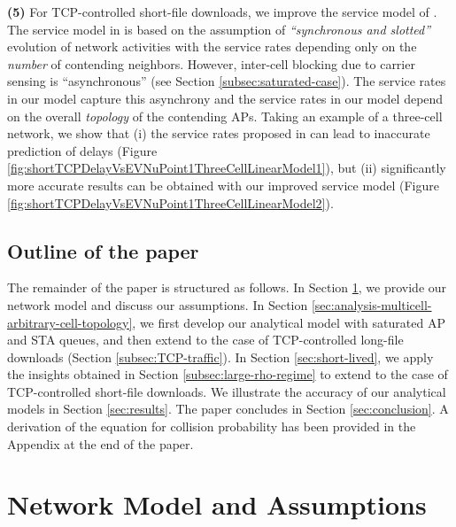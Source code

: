 \documentclass[10pt,a4paper,journal]{IEEEtran}
\theoremstyle{definition}
\theoremstyle{remark}
\theoremstyle{plain}
\begin{document}
\vspace{1mm}

\noindent \textbf{(5)} For TCP-controlled short-file downloads, we improve the service model of \cite{wanet.bonald08multicellprocsharing}. The service model in \cite{wanet.bonald08multicellprocsharing} is based on the assumption of \textit{``synchronous and slotted''} evolution of network activities with the service rates depending only on the \textit{number} of contending neighbors. However, inter-cell blocking due to carrier sensing is ``asynchronous'' (see Section \ref{subsec:saturated-case}). The service rates in our model capture this asynchrony and the service rates in our model depend on the overall \textit{topology} of the contending APs. Taking an example of a three-cell network, we show that (i) the service rates proposed in \cite{wanet.bonald08multicellprocsharing} can lead to inaccurate prediction of delays (Figure \ref{fig:shortTCPDelayVsEVNuPoint1ThreeCellLinearModel1}), but (ii) significantly more accurate results can be obtained with our improved service model (Figure \ref{fig:shortTCPDelayVsEVNuPoint1ThreeCellLinearModel2}). 








\subsection{Outline of the paper} 

The remainder of the paper is structured as follows. In Section \ref{sec:model-assumptions}, we provide our network model and discuss our assumptions. In Section \ref{sec:analysis-multicell-arbitrary-cell-topology}, we first develop our analytical model with saturated AP and STA queues, and then extend to the case of TCP-controlled long-file downloads (Section \ref{subsec:TCP-traffic}). In Section \ref{sec:short-lived}, we apply the insights obtained in Section \ref{subsec:large-rho-regime} to extend to the case of TCP-controlled short-file downloads. We illustrate the accuracy of our analytical models in Section \ref{sec:results}. The paper concludes in Section \ref{sec:conclusion}. A derivation of the equation for collision probability has been provided in the Appendix at the end of the paper. 



\section{Network Model and Assumptions}
\label{sec:model-assumptions}
\end{document}
